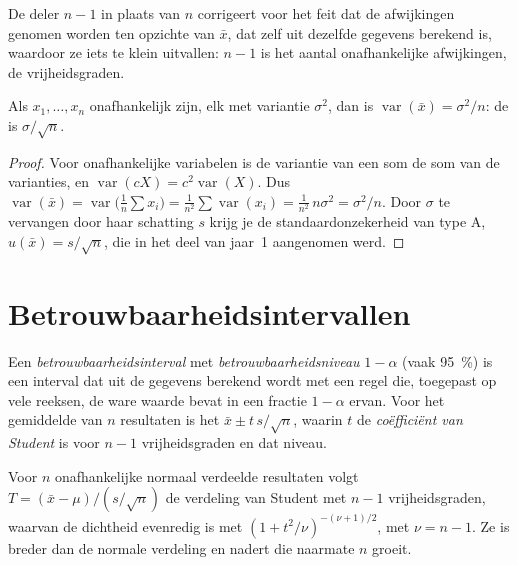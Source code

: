 De deler $n - 1$ in plaats van $n$ corrigeert voor het feit dat de afwijkingen genomen worden ten opzichte van $\bar x$,
dat zelf uit dezelfde gegevens berekend is, waardoor ze iets te klein uitvallen: $n - 1$ is het aantal
onafhankelijke afwijkingen, de vrijheidsgraden.

\begin{theorem}\label{thm:b2:measurement-statistics:mean-variance}
Als $x_1, \dots, x_n$ onafhankelijk zijn, elk met variantie $\sigma^2$, dan is $\operatorname{var}(\bar x) =
\sigma^2/n$: de  is $\sigma/\sqrt n$.
\end{theorem}

\begin{proof}
Voor onafhankelijke variabelen is de variantie van een som de som van de varianties, en
$\operatorname{var}(cX) = c^2\operatorname{var}(X)$. Dus $\operatorname{var}(\bar x) =
\operatorname{var}\bigl(\tfrac1n\sum x_i\bigr) = \tfrac{1}{n^2}\sum\operatorname{var}(x_i) =
\tfrac{1}{n^2}\,n\sigma^2 = \sigma^2/n$. Door $\sigma$ te vervangen door haar schatting $s$ krijg je de standaardonzekerheid van
type A, $u(\bar x) = s/\sqrt n$, die in het deel van jaar~1 aangenomen werd.
\end{proof}

\section{Betrouwbaarheidsintervallen}

\begin{definition}[Betrouwbaarheidsinterval]\label{def:b2:measurement-statistics:confidence}
Een \emph{betrouwbaarheidsinterval} met \emph{betrouwbaarheidsniveau}
$1 - \alpha$ (vaak 95~\%) is een interval dat uit de gegevens berekend wordt met een regel die, toegepast op
vele reeksen, de ware waarde bevat in een fractie $1 - \alpha$ ervan. Voor het gemiddelde van $n$ resultaten is het
$\bar x \pm t\,s/\sqrt n$, waarin $t$ de \emph{coëfficiënt van Student} is
voor $n - 1$ vrijheidsgraden en dat niveau.
\end{definition}

\begin{proposition}\label{prop:b2:measurement-statistics:student}
Voor $n$ onafhankelijke normaal verdeelde resultaten volgt $T = (\bar x - \mu)/(s/\sqrt n)$ de verdeling van Student met
$n - 1$ vrijheidsgraden, waarvan de dichtheid evenredig is met $(1 + t^2/\nu)^{-(\nu+1)/2}$, met
$\nu = n - 1$. Ze is breder dan de normale verdeling en nadert die naarmate $n$ groeit.
\end{proposition}

